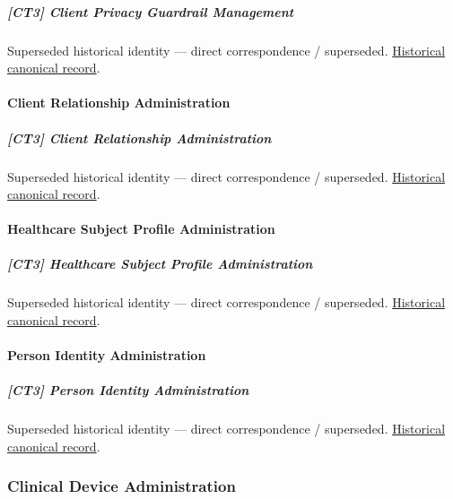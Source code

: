 \subparagraph{[CT3] Client Privacy Guardrail Management}

\par\label{element:d2e6078b5db041cb904e0cadcebce6eb}
Superseded historical identity — direct correspondence / superseded. \href{../../../../continuum/strategy/capability/d2e6078b5db041cb904e0cadcebce6eb.md}{Historical canonical record}.\par

\paragraph{Client Relationship Administration}

\subparagraph{[CT3] Client Relationship Administration}

\par\label{element:2c799ec0c4c74c97a75c12e949887b95}
Superseded historical identity — direct correspondence / superseded. \href{../../../../continuum/strategy/capability/2c799ec0c4c74c97a75c12e949887b95.md}{Historical canonical record}.\par

\paragraph{Healthcare Subject Profile Administration}

\subparagraph{[CT3] Healthcare Subject Profile Administration}

\par\label{element:d653c3247ddd49479f985f6b435933a0}
Superseded historical identity — direct correspondence / superseded. \href{../../../../continuum/strategy/capability/d653c3247ddd49479f985f6b435933a0.md}{Historical canonical record}.\par

\paragraph{Person Identity Administration}

\subparagraph{[CT3] Person Identity Administration}

\par\label{element:7550fd5b17e643118fa76d2616e1ba20}
Superseded historical identity — direct correspondence / superseded. \href{../../../../continuum/strategy/capability/7550fd5b17e643118fa76d2616e1ba20.md}{Historical canonical record}.\par

\subsubsection{Clinical Device Administration}

